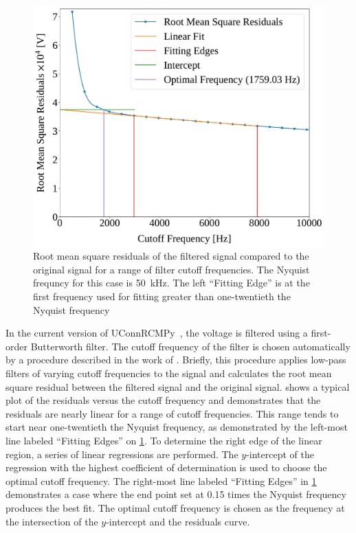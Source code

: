 \documentclass[12pt]{../ussci}
\begin{document}
\begin{figure}[htbp]
\begin{minipage}[t]{0.48\textwidth}
        \includegraphics[width=\linewidth]{figures/residuals.pdf}
        \caption{Root mean square residuals of the filtered signal compared to
        the original signal for a range of filter cutoff frequencies. The
        Nyquist frequncy for this case is \SI{50}{\kHz}. The left ``Fitting
        Edge'' is at the first frequency used for fitting greater than
        one-twentieth the Nyquist frequency}
        \label{fig:residuals}
    \end{minipage}
\end{figure}

In the current version of UConnRCMPy~\autocite{uconnrcmpy}, the voltage is
filtered using a first-order Butterworth filter. The cutoff frequency of the
filter is chosen automatically by a procedure described in the work of
\textcite{Yu1999,Duarte2014}. Briefly, this procedure applies low-pass filters
of varying cutoff frequencies to the signal and calculates the root mean square
residual between the filtered signal and the original signal.
 shows a typical plot of the residuals versus the cutoff
frequency and demonstrates that the residuals are nearly linear for a range of
cutoff frequencies. This range tends to start near one-twentieth the Nyquist
frequency, as demonstrated by the left-most line labeled ``Fitting Edges'' on
\cref{fig:residuals}. To determine the right edge of the linear region, a series
of linear regressions are performed. The $y$-intercept of the regression with
the highest coefficient of determination is used to choose the optimal cutoff
frequency. The right-most line labeled ``Fitting Edges'' in \cref{fig:residuals}
demonstrates a case where the end point set at \num{0.15} times the Nyquist
frequency produces the best fit. The optimal cutoff frequency is chosen as the
frequency at the intersection of the $y$-intercept and the residuals curve.
\end{document}
